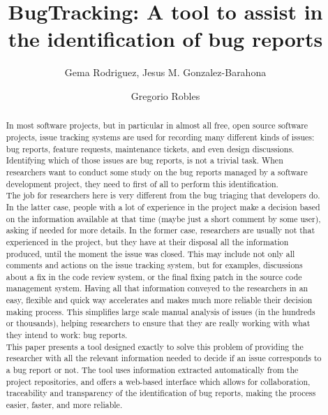 \documentclass[ifip]{svmult}
\begin{document}
\title*{BugTracking: A tool to assist in the identification of bug reports}
\author{Gema Rodriguez, Jesus M. Gonzalez-Barahona \and Gregorio Robles}
%
%
\maketitle

\begin{abstract}
	In most software projects, but in particular in almost all free, open source software projects, issue tracking systems are used for recording many different kinds of issues: bug reports, feature requests, maintenance tickets, and even design discussions. Identifying which of those issues are bug reports, is not a trivial task. When researchers want to conduct some study on the bug reports managed by a software development project, they need to first of all to perform this identification.\\

The job for researchers here is very different from the bug triaging that developers do. In the latter case, people with a lot of experience in the project make a decision based on the information available at that time (maybe just a short comment by some user), asking if needed for more details. In the former case, researchers are usually not that experienced in the project, but they have at their disposal all the information produced, until the moment the issue was closed. This may include not only all comments and actions on the issue tracking system, but for examples, discussions about a fix in the code review system, or the final fixing patch in the source code management system. Having all that information conveyed to the researchers in an easy, flexible and quick way accelerates and makes much more reliable their decision making process. This simplifies large scale manual analysis of issues (in the hundreds or thousands), helping researchers to ensure that they are really working with what they intend to work: bug reports.\\

This paper presents a tool designed exactly to solve this problem of providing the researcher with all the relevant information needed to decide if an issue corresponds to a bug report or not. The tool uses information extracted automatically from the project repositories, and offers a web-based interface which allows for collaboration, traceability and transparency of the identification of bug reports, making the process easier, faster, and more reliable.
\end{abstract}
\end{document}

